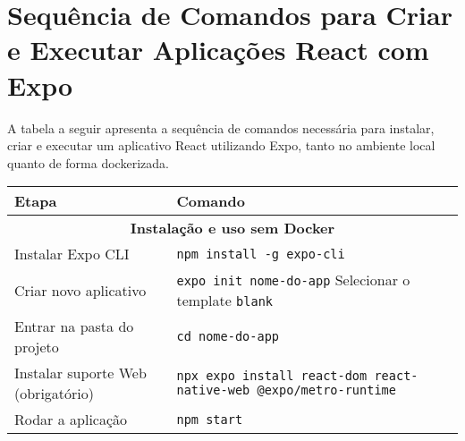 \appendix
\chapter{Sequência de Comandos para Criar e Executar Aplicações React com Expo}

A tabela a seguir apresenta a sequência de comandos necessária para instalar, criar e executar um aplicativo React utilizando Expo, tanto no ambiente local quanto de forma dockerizada.

\begin{longtable}{|p{5cm}|p{9cm}|}
\hline
\textbf{Etapa} & \textbf{Comando} \\
\hline
\multicolumn{2}{|c|}{\textbf{Instalação e uso sem Docker}} \\
\hline
Instalar Expo CLI & 
\texttt{npm install -g expo-cli} \\
\hline
Criar novo aplicativo & 
\texttt{expo init nome-do-app} \newline
Selecionar o template \texttt{blank} \\
\hline
Entrar na pasta do projeto & 
\texttt{cd nome-do-app} \\
\hline
Instalar suporte Web (obrigatório) & 
\texttt{npx expo install react-dom react-native-web @expo/metro-runtime} \\
\hline
Rodar a aplicação & 
\texttt{npm start}  \\
\hline
\hline
\end{longtable}

